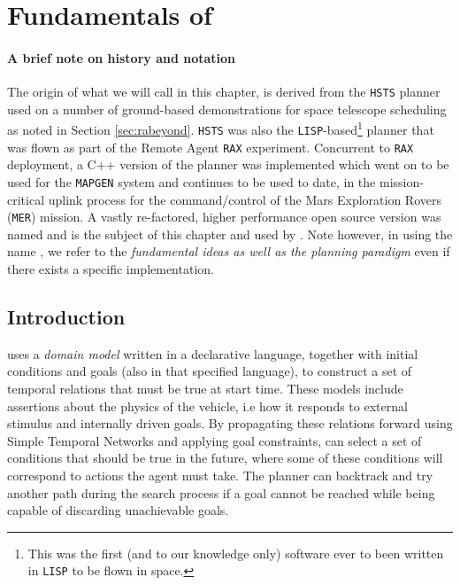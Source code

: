 \section{Fundamentals of \eu}
\label{sec:basics}

\paragraph {A brief note on \eu history and notation} The origin of
what we will call \eu in this chapter, is derived from the
\texttt{HSTS} planner \cite{mus94} used on a number of ground-based
demonstrations for space telescope scheduling as noted in Section
\ref{sec:rabeyond}. \texttt{HSTS} was also the
\texttt{LISP}-based\footnote{This was the first (and to our knowledge
  only) software ever to been written in \texttt{LISP} to be flown in
  space.} planner that was flown as part of the Remote Agent
\texttt{RAX} experiment. Concurrent to \texttt{RAX} deployment, a C++
version of the planner was implemented which went on to be used for
the \texttt{MAPGEN} \cite{bresina05} system and continues to be used
to date, in the mission-critical uplink process for the
command/control of the Mars Exploration Rovers (\texttt{MER})
mission. A vastly re-factored, higher performance open source version
\cite{europapso} was named \eut and is the subject of this chapter and
used by \rx.  Note however, in using the name \eu, we refer to the
\emph{fundamental ideas as well as the planning paradigm} even if
there exists a specific implementation.

\subsection{Introduction}
\label{sec:euintro}

\eu uses a \emph{domain model} written in a declarative language,
together with initial conditions and goals (also in that specified
language), to construct a set of temporal relations that must be true
at start time. These models include assertions about the physics of
the vehicle, i.e how it responds to external stimulus and internally
driven goals. By propagating these relations forward using Simple
Temporal Networks \cite{dechter91} and applying goal constraints, \eu
can select a set of conditions that should be true in the future,
where some of these conditions will correspond to actions the agent
must take. The planner can backtrack and try another path during the
search process if a goal cannot be reached while being capable of
discarding unachievable goals.

